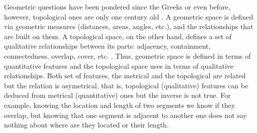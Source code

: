 \documentclass[onecollarge,runningheads]{svjour2}
\begin{document}

Geometric questions have been pondered since the Greeks or even before, however, topological ones are only one century old  \cite{edelsbrunner2010computational}. A geometric space is defined via geometric measures (distances, areas, angles, etc.), and the relationships that are built on them. A topological space, on the other hand, defines a set of qualitative relationships between its parts: adjacency, containment, connectedness, overlap, cover, etc. \cite{aleksandrov1999mathematics}. Thus, geometric space is defined in terms of quantitative features and the topological space uses
in terms of qualitative relationships.  Both set of features, the metrical and the topological are related but the relation is asymetrical, that is, topological (qualitative) features can be deduced from metrical (quantitative) ones but the inverse is not true. For example, knowing the location and length of two segments we know if they overlap, but knowing that one segment is adjacent to another one does not say nothing about where are they located or their length.
\end{document}
